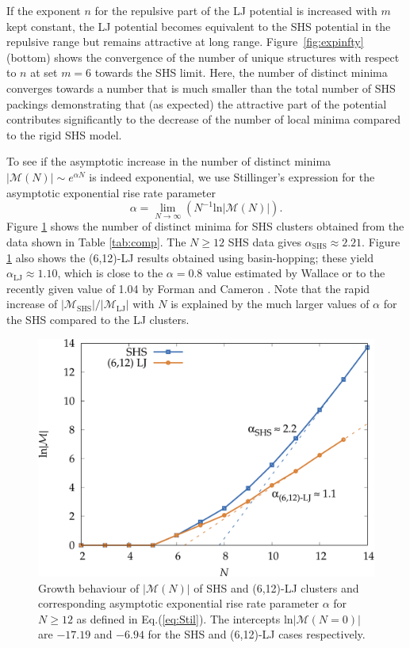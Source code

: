 If the exponent $n$ for the repulsive part of the LJ potential is increased
with $m$ kept constant, the LJ potential becomes equivalent to the \ac{SHS}
potential in the repulsive range but remains attractive at long range.
Figure~\ref{fig:expinfty} (bottom) shows the convergence of the number of
unique structures with respect to $n$ at set $m=6$ towards the \ac{SHS} limit. Here, the
number of distinct minima converges towards a number that is much smaller
than the total number of \ac{SHS} packings demonstrating that (as expected) the
attractive part of the potential contributes significantly to the decrease of
the number of local minima compared to the rigid \ac{SHS} model.

To see if the asymptotic increase in the number of distinct minima $|\mathcal{M}(N)| \sim e^{\alpha N}$ 
is indeed exponential, we use Stillinger's expression for the asymptotic exponential rise rate parameter \autocite{Stillinger_Exponentialmultiplicityinherent_1999}
\begin{equation} \label{eq:Stil}
\alpha = \lim_{N\rightarrow \infty} \left( N^{-1} \mathrm{ln} |\mathcal{M}(N)| \right).
\end{equation}
Figure \ref{fig:asympt} shows the number of distinct minima for \ac{SHS} clusters
obtained from the data shown in Table \ref{tab:comp}.  The $N \geq 12$ \ac{SHS} data
gives $\alpha_\mathrm{SHS}\approx 2.21$. Figure \ref{fig:asympt} also shows the
(6,12)-LJ results obtained using basin-hopping; these yield
$\alpha_\mathrm{LJ}\approx 1.10$, which is close to the $\alpha=0.8$ value
estimated by Wallace \autocite{Wallace-1997} or to the recently given value of 1.04
by Forman and Cameron \autocite{Forman_ModelingAggregationProcesses_2017}.  Note that the rapid increase of
$|\mathcal{M}_\mathrm{SHS}|/|\mathcal{M}_\mathrm{LJ}|$ with $N$ is explained by
the much larger values of $\alpha$ for the \ac{SHS} compared to the LJ clusters.

\begin{figure}
    \centering
    \includegraphics[width=0.8\columnwidth]{kslj/growth.pdf}
    \caption{Growth behaviour of $|\mathcal{M}(N)|$ of \acs{SHS} and (6,12)-LJ
    clusters and corresponding asymptotic exponential rise rate parameter
    $\alpha$ for $N \geq 12$ as defined in Eq.(\ref{eq:Stil}).  The intercepts
    ln$|\mathcal{M}(N=0)|$ are $-17.19$ and $-6.94$ for the \acs{SHS} and
    (6,12)-LJ cases respectively.}
    \label{fig:asympt}
\end{figure}

